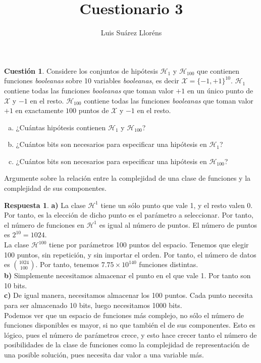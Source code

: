 \documentclass[10pt,a4paper]{article}
\author{Luis Suárez Lloréns}
\title{Cuestionario 3}
\date{}
\theoremstyle{definition}
\newtheorem{cuestion}{Cuestión}
\newtheorem*{respuesta}{Respuesta}
\begin{document}
\maketitle

\begin{cuestion}
Considere los conjuntos de hipótesis $\mathcal{H}_1$ y $\mathcal{H}_{100}$ que contienen funciones \textit{booleanas} sobre 10 variables \textit{booleanas}, es decir $\mathcal{X} = \{-1, +1\}^{10}$. $\mathcal{H}_1$ contiene todas las funciones \textit{booleanas} que toman valor $+1$ en un único punto de $\mathcal{X}$ y $-1$ en el resto. $\mathcal{H}_{100}$ contiene todas las funciones \textit{booleanas} que toman valor $+1$ en exactamente $100$ puntos de $\mathcal{X}$ y $-1$ en el resto.
\begin{enumerate}[a)]
\item ¿Cuántas hipótesis contienen $\mathcal{H}_1$ y $\mathcal{H}_{100}$?
\item ¿Cuántos bits son necesarios para especificar una hipótesis en $\mathcal{H}_1$?
\item ¿Cuántos bits son necesarios para especificar una hipótesis en $\mathcal{H}_{100}$?
\end{enumerate}

Argumente sobre la relación entre la complejidad de una clase de funciones y la complejidad de sus componentes.\\

\end{cuestion}
\begin{respuesta}
\textbf{a)}
La clase $\mathcal{H}^1$ tiene un sólo punto que vale 1, y el resto valen 0. Por tanto, es la elección de dicho punto es el parámetro a seleccionar. Por tanto, el número de funciones en $\mathcal{H}^1$ es igual al número de puntos. El número de puntos es $2^{10} = 1024$.\\

La clase $\mathcal{H}^{100}$ tiene por parámetros 100 puntos del espacio. Tenemos que elegir 100 puntos, sin repetición, y sin importar el orden. Por tanto, el número de datos es $\binom{1024}{100}$. Por tanto, tenemos $7.75 \times 10^{140} $ funciones distintas.\\

\textbf{b)}
Simplemente necesitamos almacenar el punto en el que vale 1. Por tanto son 10 bits.\\

\textbf{c)}
De igual manera, necesitamos almacenar los 100 puntos. Cada punto necesita para ser almacenado 10 bits, luego necesitamos 1000 bits.\\

Podemos ver que un espacio de funciones más complejo, no sólo el número de funciones disponibles es mayor, si no que también el de sus componentes. Esto es lógico, pues el número de parámetros crece, y esto hace crecer tanto el número de posibilidades de la clase de funciones como la complejidad de representación de una posible solución, pues necesita dar valor a una variable más.\\
\end{respuesta}
\end{document}
